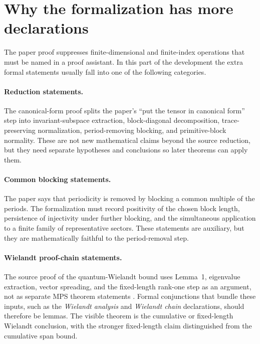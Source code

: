 \documentclass{article}
\begin{document}
\section{Why the formalization has more declarations}

The paper proof suppresses finite-dimensional and finite-index operations that
must be named in a proof assistant. In this part of the development the extra
formal statements usually fall into one of the following categories.

\paragraph{Reduction statements.}
The canonical-form proof splits the paper's ``put the tensor in canonical
form'' step into invariant-subspace extraction, block-diagonal decomposition,
trace-preserving normalization, period-removing blocking, and primitive-block
normality. These are not new mathematical claims beyond the source reduction,
but they need separate hypotheses and conclusions so later theorems can apply
them.

\paragraph{Common blocking statements.}
The paper says that periodicity is removed by blocking a common multiple of the
periods. The formalization must record positivity of the chosen block length,
persistence of injectivity under further blocking, and the simultaneous
application to a finite family of representative sectors. These statements are
auxiliary, but they are mathematically faithful to the period-removal step.

\paragraph{Wielandt proof-chain statements.}
The source proof of the quantum-Wielandt bound uses Lemma~1, eigenvalue
extraction, vector spreading, and the fixed-length rank-one step as an argument,
not as separate MPS theorem statements
\cite[Theorem~1 proof]{Sanz2010Quantum}. Formal conjunctions that bundle
these inputs, such as the \emph{Wielandt analysis} and \emph{Wielandt chain}
declarations, should therefore be lemmas. The visible theorem is the
cumulative or fixed-length Wielandt conclusion, with the stronger fixed-length
claim distinguished from the cumulative span bound.
\end{document}
